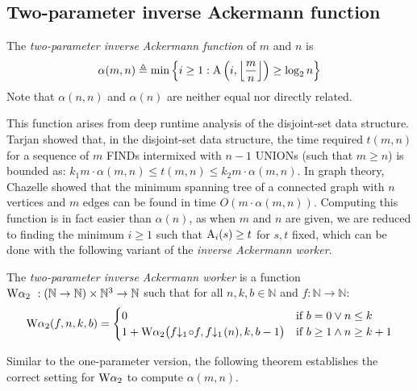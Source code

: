 \newcommand{\Texp}{\runtime_{\li{exp}}}
\newcommand{\Tmul}{\runtime_{\li{mul}}}
\newcommand{\Tleb}{\runtime_{\li{leb}}}
\newcommand{\Tsucc}{\runtime_{\li{succ}}}
\subsection{Two-parameter inverse Ackermann function}
\begin{defn} \label{defn: 2para-alpha}
	The \emph{two-parameter inverse Ackermann function} of $m$ and $n$ is
	\begin{equation} \label{eq: tmp-2para-alpha}
	\alpha(m, n) \triangleq \min\left\{i \ge 1 : \text{A}\left(i, \left\lfloor \frac{m}{n} \right\rfloor \right)\ge \log_2n \right\}
	\end{equation}
	Note that $\alpha(n, n)$ and $\alpha(n)$ are neither equal nor directly related.
\end{defn}
This function arises from deep runtime analysis of the disjoint-set data structure. Tarjan \cite{tarjan} showed that, in the disjoint-set data structure, the time required $t(m,n)$ for a sequence of $m$ \textsc{\color{magenta}FIND}s intermixed with $n-1$ \textsc{\color{magenta}UNION}s (such that $m \geq n$) is bounded as: $k_{1}m\cdot\alpha(m,n) \leq t(m,n) \leq k_{2}m\cdot\alpha(m,n)$. In graph theory, Chazelle \cite{chazelle} showed that the minimum spanning tree of a connected graph with $n$ vertices and $m$ edges can be found in time $O(m\cdot\alpha(m,n))$. Computing this function is in fact easier than $\alpha(n)$, as when $m$ and $n$ are given, we are reduced to finding the minimum $i\ge 1$ such that $\text{A}_i(s)\ge t$ for $s, t$ fixed, which can be done with the following variant of the \emph{inverse Ackermann worker}.
\begin{defn} \label{defn: 2para-inv-ack-worker}
	The \emph{two-parameter inverse Ackermann worker}  is a function $\text{W}\alpha_2\ : (\mathbb{N}\to \mathbb{N}) \times \mathbb{N}^3\to \mathbb{N}$ such that for all $n, k, b\in \mathbb{N}$ and $f:\mathbb{N}\to \mathbb{N}$:
	\begin{equation} \label{eq: 2para-inv-ack-worker-recursion}
	\W\alpha_2(f, n, k, b) = \begin{cases}
	0 & \text{if } b = 0 \vee n\le k \\ 1 + \W\alpha_2\big(\cdt{f}{1}\circ f , \cdt{f}{1}(n), k, b-1\big) & \text{if } b \ge 1 \wedge n \ge k+1
	\end{cases}
	\end{equation}
\end{defn}
Similar to the one-parameter version, the following theorem establishes the correct setting for $\text{W}\alpha_2$ to compute $\alpha(m, n)$.
